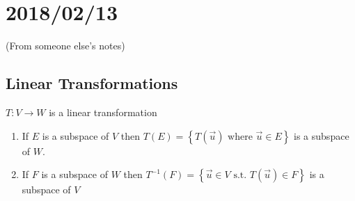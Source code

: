 \documentclass[12pt]{article}
\renewcommand{\v}[1]{\overrightarrow{#1}}
\newenvironment{proof}{\block[Proof]}{\endblock}
\newenvironment{proposition}{\block[Proposition]}{\endblock}
\newcommand{\st}[0]{\text{ s.t. }}
\newcommand{\bb}[1]{\left\{#1\right\}}
\begin{document}
\begin{proposition}
\begin{enumerate}
\begin{proof}
\begin{enumerate}
			\end{enumerate}
			
		\end{proof}
	\end{enumerate}
\end{proposition}

\section{2018/02/13}

(From someone else's notes)

\subsection{Linear Transformations}

\begin{proposition}
	$T: V \rightarrow W$ is a linear transformation
	\begin{enumerate}
		\item If $E$ is a subspace of $V$ then $T(E) = \bb{T(\v{u}) \text{ where } \v{u} \in E}$ is a subspace of $W$.
		\item If $F$ is a subspace of $W$ then $T^{-1}(F) = \bb{\v{u} \in V \st T(\v{u}) \in F}$ is a subspace of $V$
	\end{enumerate}
\end{proposition}
\end{document}
